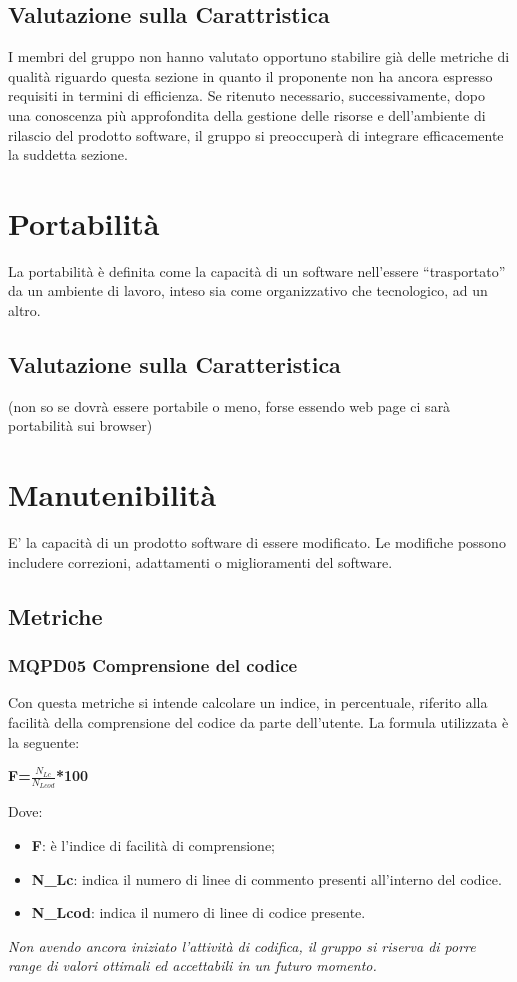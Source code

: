 \subsection{Valutazione sulla Carattristica} \label{3.4.1}
I membri del gruppo non hanno valutato opportuno stabilire già delle metriche di qualità riguardo questa sezione in quanto il proponente non ha ancora espresso requisiti in termini di efficienza. Se ritenuto necessario, successivamente, dopo una conoscenza più approfondita della gestione delle risorse e dell’ambiente di rilascio del prodotto software, il gruppo si preoccuperà di integrare efficacemente la suddetta sezione.

\section{Portabilità} \label{3.5}
La portabilità è definita come la capacità di un software nell’essere “trasportato” da un ambiente di lavoro, inteso sia come organizzativo che tecnologico,  ad un altro.
\subsection{Valutazione sulla Caratteristica} \label{3.5.1}
(non so se dovrà essere portabile o meno, forse essendo web page ci sarà portabilità sui browser)

\section{Manutenibilità} \label{3.6}
E' la capacità di un prodotto software di essere modificato. Le modifiche possono includere correzioni, adattamenti o miglioramenti del software.
\subsection{Metriche} \label{3.6.1}
\subsubsection{MQPD05 Comprensione del codice}
Con questa metriche si intende calcolare un indice, in percentuale, riferito alla facilità della comprensione del codice da parte dell'utente.
La formula utilizzata è la seguente:
\begin{center}
	\textbf{F=$\frac{N_{Lc}}{N_{Lcod}}$*100}
\end{center}
Dove:
\begin{itemize}
	\item \textbf{F}: è l'indice di facilità di comprensione;
	\item \textbf{N\_{Lc}}: indica il numero di linee di commento presenti all'interno del codice.
	\item \textbf{N\_{Lcod}}: indica il numero di linee di codice presente.
\end{itemize}

\textit{Non avendo ancora iniziato l'attività di codifica, il gruppo si riserva di porre range di valori ottimali ed accettabili in un futuro momento.}